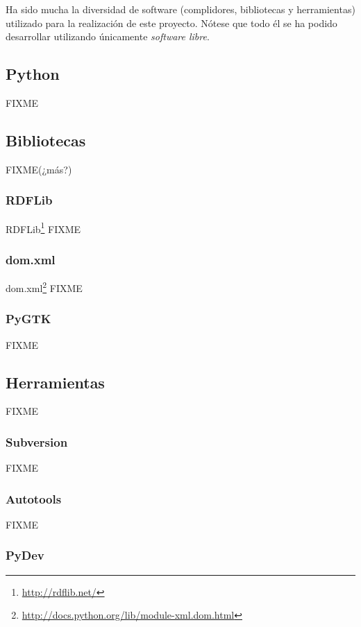 Ha sido mucha la diversidad de software (complidores, bibliotecas y herramientas)
utilizado para la realización de este proyecto. Nótese que todo él se ha podido
desarrollar utilizando únicamente \emph{software libre}.

\subsection{Python}

FIXME

\subsection{Bibliotecas\label{sec:conclu:bib}}

FIXME(¿más?)

\subsubsection{RDFLib}

RDFLib\footnote{\url{http://rdflib.net/}} FIXME

\subsubsection{dom.xml}

dom.xml\footnote{\url{http://docs.python.org/lib/module-xml.dom.html}} FIXME

\subsubsection{PyGTK}

FIXME

\subsection{Herramientas}

FIXME

\subsubsection{Subversion}

FIXME

\subsubsection{Autotools}

FIXME

\subsubsection{PyDev}

